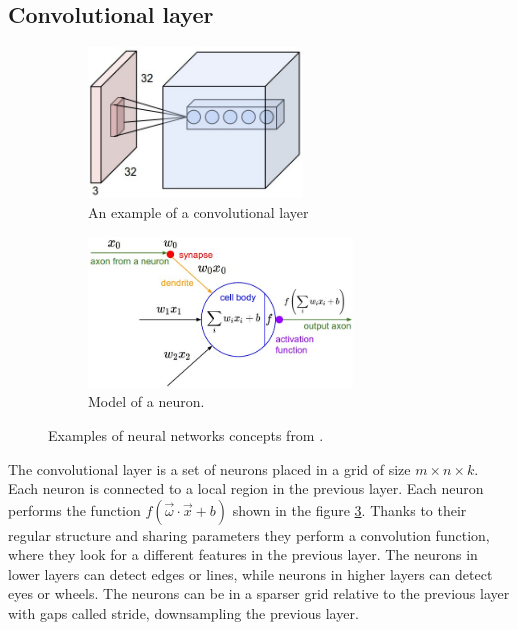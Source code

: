 \documentclass[a4paper,12pt,titlepage]{article}
\numberwithin{figure}{section}
\begin{document}
\subsection{Convolutional layer}

\begin{figure}
    \begin{subfigure}[Sample1]{0.5\linewidth}
    	\includegraphics[height=40mm]{fig/conv1.jpeg} 
        \caption{An example of a convolutional layer}
        \label{fig:conv_layer}   
    \end{subfigure}
    \qquad
    \begin{subfigure}[Sample1]{0.5\linewidth} 
    	\includegraphics[height=40mm]{fig/conv2.jpeg}
        \caption{Model of a neuron.}   
        \label{fig:neuron}
    \end{subfigure} 
    \caption{Examples of neural networks concepts from \cite{karpathy2016cs231n}.}
\end{figure}

The convolutional layer is a set of neurons placed in a grid of size $m \times n \times k$. Each neuron is connected to a local region in the previous layer. Each neuron performs the function $f(\overrightarrow{\omega} \cdot \overrightarrow{x} + b)$ shown in the figure \ref{fig:neuron}. Thanks to their regular structure and sharing parameters they perform a convolution function, where they look for a different features in the previous layer. The neurons in lower layers can detect edges or lines, while neurons in higher layers can detect eyes or wheels. The neurons can be in a sparser grid relative to the previous layer with gaps called stride, downsampling the previous layer. 
\end{document}
